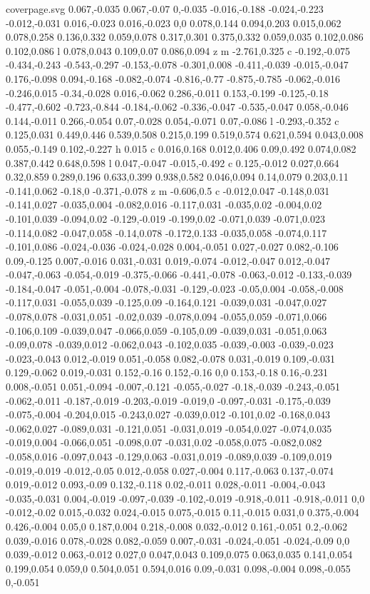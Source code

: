 \begin{filecontents}[noheader]{coverpage.svg}
0.067,-0.035 0.067,-0.07 0,-0.035 -0.016,-0.188 -0.024,-0.223 -0.012,-0.031 0.016,-0.023 0.016,-0.023 0,0 0.078,0.144 0.094,0.203 0.015,0.062 0.078,0.258 0.136,0.332 0.059,0.078 0.317,0.301 0.375,0.332 0.059,0.035 0.102,0.086 0.102,0.086 l 0.078,0.043 0.109,0.07 0.086,0.094 z m -2.761,0.325 c -0.192,-0.075 -0.434,-0.243 -0.543,-0.297 -0.153,-0.078 -0.301,0.008 -0.411,-0.039 -0.015,-0.047 0.176,-0.098 0.094,-0.168 -0.082,-0.074 -0.816,-0.77 -0.875,-0.785 -0.062,-0.016 -0.246,0.015 -0.34,-0.028 0.016,-0.062 0.286,-0.011 0.153,-0.199 -0.125,-0.18 -0.477,-0.602 -0.723,-0.844 -0.184,-0.062 -0.336,-0.047 -0.535,-0.047 0.058,-0.046 0.144,-0.011 0.266,-0.054 0.07,-0.028 0.054,-0.071 0.07,-0.086 l -0.293,-0.352 c 0.125,0.031 0.449,0.446 0.539,0.508 0.215,0.199 0.519,0.574 0.621,0.594 0.043,0.008 0.055,-0.149 0.102,-0.227 h 0.015 c 0.016,0.168 0.012,0.406 0.09,0.492 0.074,0.082 0.387,0.442 0.648,0.598 l 0.047,-0.047 -0.015,-0.492 c 0.125,-0.012 0.027,0.664 0.32,0.859 0.289,0.196 0.633,0.399 0.938,0.582 0.046,0.094 0.14,0.079 0.203,0.11 -0.141,0.062 -0.18,0 -0.371,-0.078 z m -0.606,0.5 c -0.012,0.047 -0.148,0.031 -0.141,0.027 -0.035,0.004 -0.082,0.016 -0.117,0.031 -0.035,0.02 -0.004,0.02 -0.101,0.039 -0.094,0.02 -0.129,-0.019 -0.199,0.02 -0.071,0.039 -0.071,0.023 -0.114,0.082 -0.047,0.058 -0.14,0.078 -0.172,0.133 -0.035,0.058 -0.074,0.117 -0.101,0.086 -0.024,-0.036 -0.024,-0.028 0.004,-0.051 0.027,-0.027 0.082,-0.106 0.09,-0.125 0.007,-0.016 0.031,-0.031 0.019,-0.074 -0.012,-0.047 0.012,-0.047 -0.047,-0.063 -0.054,-0.019 -0.375,-0.066 -0.441,-0.078 -0.063,-0.012 -0.133,-0.039 -0.184,-0.047 -0.051,-0.004 -0.078,-0.031 -0.129,-0.023 -0.05,0.004 -0.058,-0.008 -0.117,0.031 -0.055,0.039 -0.125,0.09 -0.164,0.121 -0.039,0.031 -0.047,0.027 -0.078,0.078 -0.031,0.051 -0.02,0.039 -0.078,0.094 -0.055,0.059 -0.071,0.066 -0.106,0.109 -0.039,0.047 -0.066,0.059 -0.105,0.09 -0.039,0.031 -0.051,0.063 -0.09,0.078 -0.039,0.012 -0.062,0.043 -0.102,0.035 -0.039,-0.003 -0.039,-0.023 -0.023,-0.043 0.012,-0.019 0.051,-0.058 0.082,-0.078 0.031,-0.019 0.109,-0.031 0.129,-0.062 0.019,-0.031 0.152,-0.16 0.152,-0.16 0,0 0.153,-0.18 0.16,-0.231 0.008,-0.051 0.051,-0.094 -0.007,-0.121 -0.055,-0.027 -0.18,-0.039 -0.243,-0.051 -0.062,-0.011 -0.187,-0.019 -0.203,-0.019 -0.019,0 -0.097,-0.031 -0.175,-0.039 -0.075,-0.004 -0.204,0.015 -0.243,0.027 -0.039,0.012 -0.101,0.02 -0.168,0.043 -0.062,0.027 -0.089,0.031 -0.121,0.051 -0.031,0.019 -0.054,0.027 -0.074,0.035 -0.019,0.004 -0.066,0.051 -0.098,0.07 -0.031,0.02 -0.058,0.075 -0.082,0.082 -0.058,0.016 -0.097,0.043 -0.129,0.063 -0.031,0.019 -0.089,0.039 -0.109,0.019 -0.019,-0.019 -0.012,-0.05 0.012,-0.058 0.027,-0.004 0.117,-0.063 0.137,-0.074 0.019,-0.012 0.093,-0.09 0.132,-0.118 0.02,-0.011 0.028,-0.011 -0.004,-0.043 -0.035,-0.031 0.004,-0.019 -0.097,-0.039 -0.102,-0.019 -0.918,-0.011 -0.918,-0.011 0,0 -0.012,-0.02 0.015,-0.032 0.024,-0.015 0.075,-0.015 0.11,-0.015 0.031,0 0.375,-0.004 0.426,-0.004 0.05,0 0.187,0.004 0.218,-0.008 0.032,-0.012 0.161,-0.051 0.2,-0.062 0.039,-0.016 0.078,-0.028 0.082,-0.059 0.007,-0.031 -0.024,-0.051 -0.024,-0.09 0,0 0.039,-0.012 0.063,-0.012 0.027,0 0.047,0.043 0.109,0.075 0.063,0.035 0.141,0.054 0.199,0.054 0.059,0 0.504,0.051 0.594,0.016 0.09,-0.031 0.098,-0.004 0.098,-0.055 0,-0.051 
\end{filecontents}
